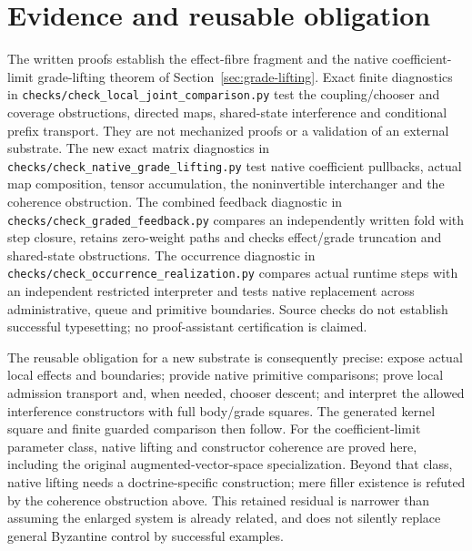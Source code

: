 \documentclass[11pt]{article}
\begin{document}
\section{Evidence and reusable obligation}

The written proofs establish the effect-fibre fragment and the native coefficient-limit grade-lifting theorem of Section~\ref{sec:grade-lifting}. Exact finite diagnostics in \texttt{checks/check\_local\_joint\_comparison.py} test the coupling/chooser and coverage obstructions, directed maps, shared-state interference and conditional prefix transport. They are not mechanized proofs or a validation of an external substrate. The new exact matrix diagnostics in \texttt{checks/check\_native\_grade\_lifting.py} test native coefficient pullbacks, actual map composition, tensor accumulation, the noninvertible interchanger and the coherence obstruction. The combined feedback diagnostic in \texttt{checks/check\_graded\_feedback.py} compares an independently written fold with step closure, retains zero-weight paths and checks effect/grade truncation and shared-state obstructions. The occurrence diagnostic in \texttt{checks/check\_occurrence\_realization.py} compares actual runtime steps with an independent restricted interpreter and tests native replacement across administrative, queue and primitive boundaries. Source checks do not establish successful typesetting; no proof-assistant certification is claimed.

The reusable obligation for a new substrate is consequently precise: expose actual local effects and boundaries; provide native primitive comparisons; prove local admission transport and, when needed, chooser descent; and interpret the allowed interference constructors with full body/grade squares. The generated kernel square and finite guarded comparison then follow. For the coefficient-limit parameter class, native lifting and constructor coherence are proved here, including the original augmented-vector-space specialization. Beyond that class, native lifting needs a doctrine-specific construction; mere filler existence is refuted by the coherence obstruction above. This retained residual is narrower than assuming the enlarged system is already related, and does not silently replace general Byzantine control by successful examples.
\end{document}
